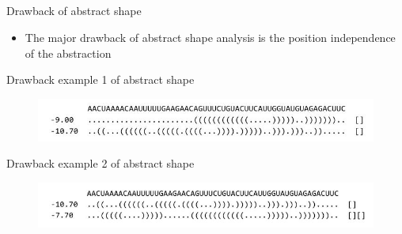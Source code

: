 \documentclass[ignorenonframetext,10pt]{beamer}
\begin{document}
\subsection{}
\begin{frame}
\frametitle{}
   \begin{block}{\small Drawback of abstract shape}
   \begin{itemize} 
   \item The major drawback of abstract shape analysis is the position
   independence of the abstraction
   \end{itemize}
   \end{block}
   \begin{block}{\small Drawback example 1 of abstract shape}
   \begin{figure}
     \includegraphics[scale=0.55]{images/drawback_1.jpg} 
   \end{figure}
   \end{block}
   \begin{block}{\small Drawback example 2 of abstract shape}
   \begin{figure}
     \includegraphics[scale=0.55]{images/drawback_2.jpg} 
   \end{figure}
   \end{block}
\end{frame}
\end{document}

